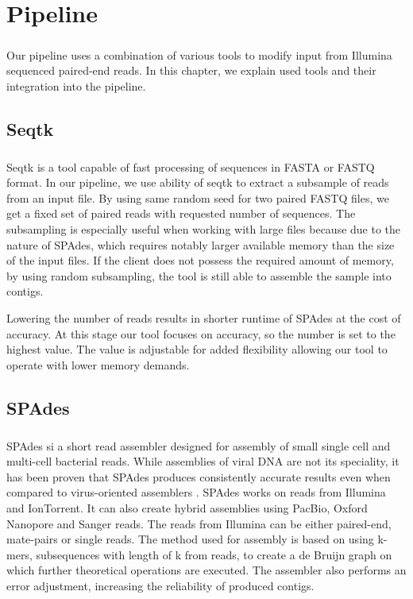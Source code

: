 \chapter{Pipeline}

\label{kap:pipeline} %
\paragraph*{}
Our pipeline uses a combination of various tools to modify input from Illumina sequenced paired-end reads. In this chapter, we explain used tools and their integration into the pipeline. 
\section{Seqtk}
\paragraph*{}
Seqtk\cite{li2012seqtk} is a tool capable of fast processing of sequences in FASTA or FASTQ format. In our pipeline, we use ability of seqtk to extract a subsample of reads from an input file. By using same random seed for two paired FASTQ files, we get a fixed set of paired reads with requested number of sequences. The subsampling is especially useful when working with large files because due to the nature of SPAdes, which requires notably larger available memory than the size of the input files. If the client does not possess the required amount of memory, by using random subsampling, the tool is still able to assemble the sample into contigs. 

Lowering the number of reads results in shorter runtime of SPAdes at the cost of accuracy. At this stage our tool focuses on accuracy, so the number is set to the highest value. The value is adjustable for added flexibility allowing our tool to operate with lower memory demands.

\section{SPAdes}
\paragraph*{}
SPAdes\cite{bankevich2012spades} si a short read assembler designed for assembly of small single cell and multi-cell bacterial reads. While assemblies of viral DNA are not its speciality, it has been proven that SPAdes produces consistently accurate results even when compared to virus-oriented assemblers \cite{sutton2019choice}. SPAdes works on reads from Illumina and IonTorrent. It can also create hybrid assemblies using PacBio, Oxford Nanopore and Sanger reads. The reads from Illumina can be either paired-end, mate-pairs or single reads. The method used for assembly is based on using k-mers, subsequences with length of k from reads, to create a de Bruijn graph on which further theoretical operations are executed. The assembler also performs an error adjustment, increasing the reliability of produced contigs.
